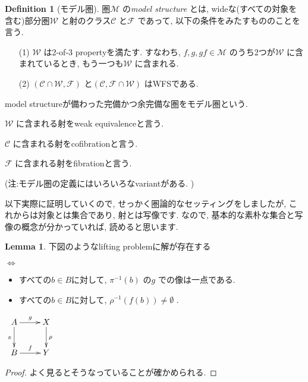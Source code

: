 \documentclass[. /main]{subfiles}
\theoremstyle{definition}
\newtheorem{defi}[theo]{Definition}
\newtheorem{lemm}[theo]{Lemma}
\begin{document}
\begin{defi}[モデル圏]
圏$\mathcal{M}$ の{\it model structure} とは, wideな(すべての対象を含む)部分圏$\mathcal{W}$ と射のクラス$\mathcal{C}$ と$\mathcal{F}$ であって, 以下の条件をみたすもののことを言う. 
\begin{itemize}
\item[(1)] $\mathcal{W}$ は2-of-3 propertyを満たす. すなわち, $f,  g,  gf \in \mathcal{M}$ のうち2つが$\mathcal{W}$ に含まれているとき, もう一つも$\mathcal{W}$ に含まれる. 
\item[(2)] $(\mathcal{C} \cap \mathcal{W},  \mathcal{F})$ と$(\mathcal{C},  \mathcal{F} \cap \mathcal{W})$ はWFSである. 
\end{itemize}

model structureが備わった完備かつ余完備な圏をモデル圏という. 

$\mathcal{W}$ に含まれる射をweak equivalenceと言う. 

$\mathcal{C}$ に含まれる射をcofibrationと言う. 

$\mathcal{F}$ に含まれる射をfibrationと言う. 

(注:モデル圏の定義にはいろいろなvariantがある. )
\end{defi}

以下実際に証明していくので, せっかく圏論的なセッティングをしましたが, これからは対象とは集合であり, 射とは写像です. なので, 基本的な素朴な集合と写像の概念が分かっていれば, 読めると思います. 
\begin{lemm}
下図のようなlifting problemに解が存在する

$\Leftrightarrow$
\begin{itemize}
\item すべての$b \in B$に対して, ${\pi}^{-1}(b)$ の$g$ での像は一点である. 
\item すべての$b \in B$に対して, ${\rho}^{-1}(f(b)) \neq \emptyset$ . 
\end{itemize}

\begin{center}
$\xymatrix{
A \ar[d]_{\pi} \ar[r]^g \ar@{}[dr] & X \ar[d]^{\rho} \\
B \ar[r]^f & Y \\
}$
\end{center}
\end{lemm}
\begin{proof}
よく見るとそうなっていることが確かめられる. 
\end{proof}
\end{document}
